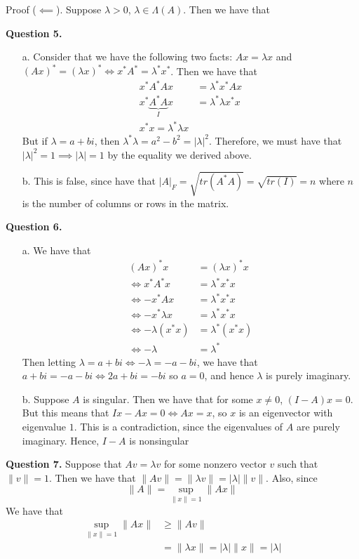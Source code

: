 \documentclass{article}
\begin{document}
Proof ($\impliedby$). Suppose $\lambda > 0$, $\lambda \in \Lambda(A)$. Then we have that 

\textbf{Question 5.} 
\begin{itemize}
    \item[a.] Consider that we have the following two facts: $Ax =\lambda x$ and $(Ax)^*=\left(\lambda x\right)^* \iff x^*A^*=\lambda^* x^*$. Then we have that
    \begin{align*}
        x^* A^* A x &= \lambda^* x^* Ax \\
        x^* \underbrace{A^* A}_{I} x &= \lambda^* \lambda x^* x\\
        x^* x= \lambda^* \lambda x 
    \end{align*} 
    But if $\lambda = a+bi$, then $\lambda^*\lambda = a^2-b^2 = \left| \lambda\right|^2$. Therefore, we must have that $\left| \lambda\right|^2 = 1\implies |\lambda | = 1$ by the equality we derived above. 
    \item[b.] This is false, since have that $\left| A\right|_F = \sqrt{tr(A^*A)} = \sqrt{tr(I)} = n$ where $n$ is the number of columns or rows in the matrix. 
\end{itemize}

\textbf{Question 6.} 
\begin{itemize}
    \item[a.] We have that 
    \begin{align*}
        (Ax)^*x &= (\lambda x)^* x \\
        \iff x^* A^* x &= \lambda^* x^* x\\
        \iff -x^*Ax &= \lambda^*x^*x\\
        \iff -x^*\lambda x &= \lambda^* x^* x \\
        \iff -\lambda (x^*x) &= \lambda^* (x^*x)\\
        \iff -\lambda &= \lambda^*
    \end{align*} 
    Then letting $\lambda = a+bi \iff -\lambda = -a-bi$, we have that $a+bi = -a-bi \iff 2a + bi = -bi$ so $a=0$, and hence $\lambda$ is purely imaginary.
    \item[b.] Suppose $A$ is singular. Then we have that for some $x \neq 0$, $(I-A)x=0$. But this means that $Ix-Ax = 0 \iff Ax = x$, so $x$ is an eigenvector with eigenvalue $1$. This is a contradiction, since the eigenvalues of $A$ are purely imaginary. Hence, $I-A$ is nonsingular
\end{itemize}

\textbf{Question 7.} Suppose that $Av=\lambda v$ for some nonzero vector $v$ such that $\| v \|=1$. Then we have that $\| Av \| = \|\lambda v\| = |\lambda|\|v\|$. Also, since 
\begin{equation*}
    \|A\| = \sup_{\|x\| =1}\|Ax\|
\end{equation*}
We have that 
\begin{align*}
    \sup_{\|x\| = 1}\|Ax\| &\geq \|Av\| \\
    &=\|\lambda x \| = |\lambda|\|x\| = |\lambda|
\end{align*}
\end{document}
